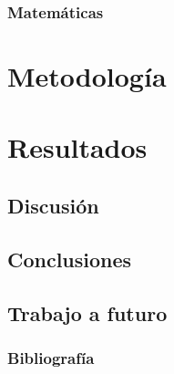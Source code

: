 \documentclass{beamer}
\theoremstyle{definition}
\begin{document}
\begin{frame}

\end{frame}


\subsubsection{Matem\'aticas}


\section{Metodolog\'ia}


\section{Resultados}


\subsection{Discusi\'on}


\subsection{Conclusiones}


\subsection{Trabajo a futuro}


\begin{frame}[allowframebreaks]
\frametitle{Bibliograf\'ia}
\footnotesize{
%
{}
%

}
\end{frame}

\end{document}
